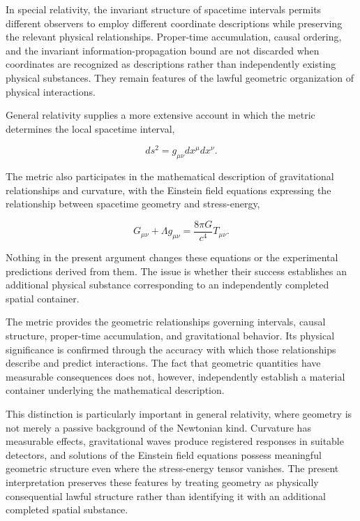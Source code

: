 \documentclass[12pt,onecolumn]{article}
\begin{document}
In special relativity, the invariant structure of spacetime intervals permits different observers to employ different coordinate descriptions while preserving the relevant physical relationships. Proper-time accumulation, causal ordering, and the invariant information-propagation bound are not discarded when coordinates are recognized as descriptions rather than independently existing physical substances. They remain features of the lawful geometric organization of physical interactions.

General relativity supplies a more extensive account in which the metric determines the local spacetime interval,

\begin{equation}
ds^2 = g_{\mu\nu}dx^\mu dx^\nu.
\end{equation}

The metric also participates in the mathematical description of gravitational relationships and curvature, with the Einstein field equations expressing the relationship between spacetime geometry and stress-energy,

\begin{equation}
G_{\mu\nu}+\Lambda g_{\mu\nu}
=
\frac{8\pi G}{c^4}T_{\mu\nu}.
\end{equation}

Nothing in the present argument changes these equations or the experimental predictions derived from them. The issue is whether their success establishes an additional physical substance corresponding to an independently completed spatial container.

The metric provides the geometric relationships governing intervals, causal structure, proper-time accumulation, and gravitational behavior. Its physical significance is confirmed through the accuracy with which those relationships describe and predict interactions. The fact that geometric quantities have measurable consequences does not, however, independently establish a material container underlying the mathematical description.

This distinction is particularly important in general relativity, where geometry is not merely a passive background of the Newtonian kind. Curvature has measurable effects, gravitational waves produce registered responses in suitable detectors, and solutions of the Einstein field equations possess meaningful geometric structure even where the stress-energy tensor vanishes. The present interpretation preserves these features by treating geometry as physically consequential lawful structure rather than identifying it with an additional completed spatial substance.
\end{document}
